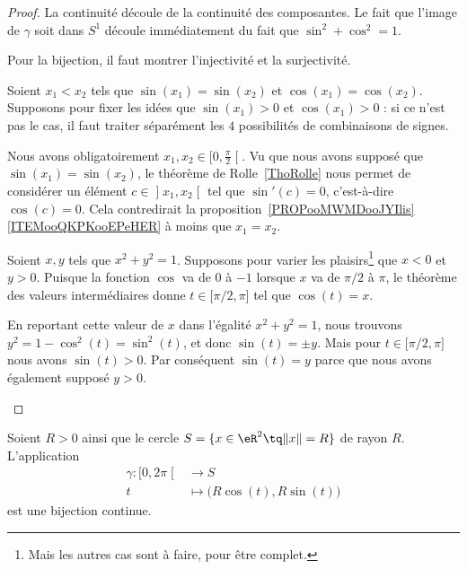 \begin{proof}
	La continuité découle de la continuité des composantes. Le fait que l'image de \( \gamma\) soit dans \( S^1\) découle immédiatement du fait que \( \sin^2+\cos^2=1\).

	Pour la bijection, il faut montrer l'injectivité et la surjectivité.
	\begin{subproof}
		\spitem[Injectif]
		Soient \( x_1<x_2\) tels que \( \sin(x_1)=\sin(x_2)\) et \( \cos(x_1)=\cos(x_2)\). Supposons pour fixer les idées que \( \sin(x_1)>0\) et \( \cos(x_1)>0\) : si ce n'est pas le cas, il faut traiter séparément les \( 4\) possibilités de combinaisons de signes.

		Nous avons obligatoirement \( x_1,x_2\in\mathopen[ 0 , \frac{ \pi }{ 2 } \mathclose[\). Vu que nous avons supposé que \( \sin(x_1)=\sin(x_2)\), le théorème de Rolle~\ref{ThoRolle} nous permet de considérer un élément \( c\in \mathopen] x_1 , x_2 \mathclose[\) tel que \( \sin'(c)=0\), c'est-à-dire \( \cos(c)=0\). Cela contredirait la proposition~\ref{PROPooMWMDooJYIlis}\ref{ITEMooQKPKooEPeHER} à moins que \( x_1=x_2\).

		\spitem[Surjectif]

		Soient \( x,y\) tels que \( x^2+y^2=1\). Supposons pour varier les plaisirs\footnote{Mais les autres cas sont à faire, pour être complet.} que \( x<0\) et \( y>0\). Puisque la fonction \( \cos\) va de \( 0\) à \( -1\) lorsque \( x\) va de \( \pi/2\) à \( \pi\), le théorème des valeurs intermédiaires donne \( t\in\mathopen[ \pi/2 , \pi \mathclose]\) tel que \( \cos(t)=x\).

		En reportant cette valeur de \( x\) dans l'égalité \( x^2+y^2=1\), nous trouvons \( y^2=1-\cos^2(t)=\sin^2(t)\), et donc \( \sin(t)=\pm y\). Mais pour \( t\in \mathopen[ \pi/2 , \pi \mathclose]\) nous avons \( \sin(t)>0\). Par conséquent \( \sin(t)=y\) parce que nous avons également supposé \( y>0\).
	\end{subproof}
\end{proof}

\begin{corollary}       \label{CORooAKMKooORqcrO}
	Soient \( R>0\) ainsi que le cercle \( S=\{ x\in \eR^2\tq \| x \|=R \}\) de rayon \( R\). L'application
	\begin{equation}
		\begin{aligned}
			\gamma\colon \mathopen[ 0 , 2\pi \mathclose[ & \to S                                 \\
			t                                            & \mapsto \big( R\cos(t),R\sin(t) \big)
		\end{aligned}
	\end{equation}
	est une bijection continue.
\end{corollary}

